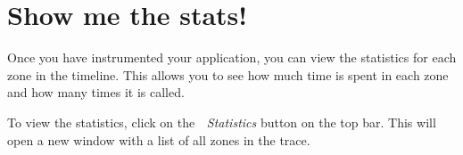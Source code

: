 \chapter{Show me the stats! }
\hypertarget{md__mono_engine_2thirdparty_2tracy_2profiler_2src_2achievements_2_instrumentation_statistics}{}\label{md__mono_engine_2thirdparty_2tracy_2profiler_2src_2achievements_2_instrumentation_statistics}
\label{md__mono_engine_2thirdparty_2tracy_2profiler_2src_2achievements_2_instrumentation_statistics_autotoc_md1109}%
%


Once you have instrumented your application, you can view the statistics for each zone in the timeline. This allows you to see how much time is spent in each zone and how many times it is called.

To view the statistics, click on the {\itshape  Statistics} button on the top bar. This will open a new window with a list of all zones in the trace. 